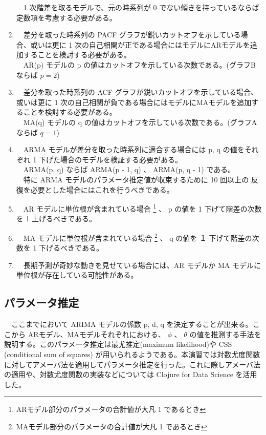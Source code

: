 \documentclass{scrartcl}
\begin{document}
\begin{enumerate}
　1 次階差を取るモデルで、元の時系列が 0 でない傾きを持っているならば 定数項を考慮する必要がある。\\
\item 　差分を取った時系列の PACF グラフが鋭いカットオフを示している場合、或いは更に 1 次の自己相関が正である場合にはモデルにARモデルを追加することを検討する必要がある。\\
　AR(p) モデルの p の値はカットオフを示している次数である。(グラフBならば \(p = 2\))\\
\item 　差分を取った時系列の ACF グラフが鋭いカットオフを示している場合、或いは更に 1 次の自己相関が負である場合にはモデルにMAモデルを追加することを検討する必要がある。\\
　MA(q) モデルの q の値はカットオフを示している次数である。(グラフAならば \(q=1\))\\
\item 　ARMA モデルが差分を取った時系列に適合する場合には p, q の値をそれぞれ 1 下げた場合のモデルを検証する必要がある。\\
　ARMA(p, q) ならば ARMA(p - 1, q) 、 ARMA(p, q - 1) である。\\
　特に ARMA モデルのパラメータ推定値が収束するために 10 回以上の 反復を必要とした場合にはこれを行うべきである。\\
\item 　AR モデルに単位根が含まれている場合 \footnote{ARモデル部分のパラメータの合計値が大凡 1 であるとき} 、 p の値を 1 下げて階差の次数を 1 上げるべきである。\\
\item 　MA モデルに単位根が含まれている場合 \footnote{MAモデル部分のパラメータの合計値が大凡 1 であるとき} 、 q の値を １ 下げて階差の次数を 1 下げるべきである。\\
\item 　長期予測が奇妙な動きを見せている場合には、AR モデルか MA モデルに単位根が存在している可能性がある。\\
\end{enumerate}

\subsection{パラメータ推定}
\label{sec:org25b7e6f}
　ここまでにおいて ARIMA モデルの係数 p, d, q を決定することが出来る。ここから ARモデル、MAモデルそれぞれにおける、 \(\phi\) 、 \(\theta\) の値を推測する手法を説明する。このパラメータ推定は最尤推定(maximum likelihood)や CSS (conditional sum of squares) が用いられるようである。本演習では対数尤度関数に対してアメーバ法を適用してパラメータ推定を行った。これに際しアメーバ法の適用や、対数尤度関数の実装などについては Clojure for Data Science \cite{data-science} を活用した。\\
\end{document}
